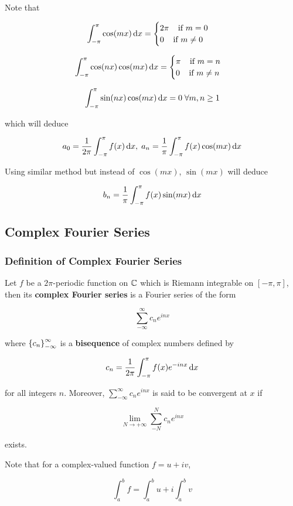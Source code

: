 \documentclass[a4paper,12pt]{article}
\begin{document}
Note that

$$\int_{-\pi}^{\pi}\cos(mx)\,\mathrm{d} x=\begin{cases}
  2\pi\;\;\;\;\text{if }m=0\\
  0\;\;\;\;\text{if }m\neq 0
\end{cases}$$\s

$$\int_{-\pi}^{\pi}\cos(nx)\cos(mx)\,\mathrm{d} x=\begin{cases}
  \pi\;\;\;\;\text{if }m=n\\
  0\;\;\;\;\text{if }m\neq n
\end{cases}$$\s

$$\int_{-\pi}^{\pi}\sin(nx)\cos(mx)\,\mathrm{d} x=0\;\forall m,n\geq 1$$\s

which will deduce

$$a_{0}=\frac{1}{2\pi}\int_{-\pi}^{\pi}f(x)\,\mathrm{d} x,\;a_{n}=\frac{1}{\pi}\int_{-\pi}^{\pi}f(x)\cos(mx)\,\mathrm{d} x$$\s

Using similar method but instead of $\cos(mx)$, $\sin(mx)$ will deduce

$$b_{n}=\frac{1}{\pi}\int_{-\pi}^{\pi}f(x)\sin(mx)\,\mathrm{d} x$$

\subsection{Complex Fourier Series}
\subsubsection{Definition of Complex Fourier Series}
\begin{dft}
  Let $f$ be a $2\pi$-periodic function on $\mathbb{C}$ which is Riemann integrable on $[-\pi,\pi]$, then its \textbf{complex Fourier series} is a Fourier series of the form

  $$\sum_{-\infty}^{\infty}c_{n}e^{inx}$$

  where $\left\{ c_{n}\right\}_{-\infty}^{\infty}$ is a \textbf{bisequence} of complex numbers defined by

  $$c_{n}=\frac{1}{2\pi}\int_{-\pi}^{\pi}f(x)e^{-inx}\,\mathrm{d} x$$\s
  
  for all integers $n$. Moreover, $\sum_{-\infty}^{\infty}c_{n}e^{inx}$ is said to be convergent at $x$ if

  $$\lim_{N\to+\infty}\sum_{-N}^{N}c_{n}e^{inx}$$\s

  exists.
\end{dft}\n

Note that for a complex-valued function $f=u+iv$,

$$\int_{a}^{b}f=\int_{a}^{b}u+i\int_{a}^{b}v$$\s
\end{document}
